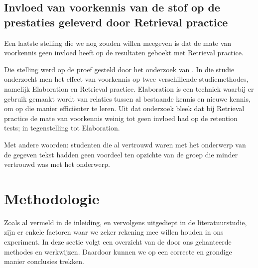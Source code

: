 \documentclass{hogent-article}
\begin{document}
\subsection{Invloed van voorkennis van de stof op de prestaties geleverd door Retrieval practice}
\label{voorkennis}
Een laatste stelling die we nog zouden willen meegeven is dat de mate van voorkennis geen invloed heeft op de resultaten geboekt met Retrieval practice.\\
\par
\noindent
Die stelling werd op de proef gesteld door het onderzoek van \textcite{Xiaofeng_2016}. In die studie onderzocht men het effect van voorkennis op twee verschillende studiemethodes, namelijk Elaboration en Retrieval practice. Elaboration is een techniek waarbij er gebruik gemaakt wordt van relaties tussen al bestaande kennis en nieuwe kennis, om op die manier efficiënter te leren. Uit dat onderzoek bleek dat bij Retrieval practice de mate van voorkennis weinig tot geen invloed had op de retention tests; in tegenstelling tot Elaboration.\\
\par
\noindent
Met andere woorden: studenten die al vertrouwd waren met het onderwerp van de gegeven tekst hadden geen voordeel ten opzichte van de groep die minder vertrouwd was met het onderwerp.

\section{Methodologie}
\label{methodologie}
Zoals al vermeld in de inleiding, en vervolgens uitgediept in de literatuurstudie, zijn er enkele factoren waar we zeker rekening mee willen houden in ons experiment. In deze sectie volgt een overzicht van de door ons gehanteerde methodes en werkwijzen. Daardoor kunnen we op een correcte en grondige manier conclusies trekken.
\end{document}
